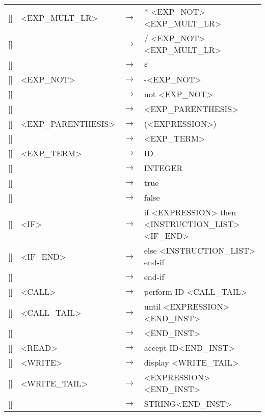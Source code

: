 \documentclass[a4paper,11pt]{article}
\newcounter{rule}
\newcommand{\addRule}[2]{%
	\stepcounter{rule} [\arabic{rule}] & #1 & $\rightarrow$ & #2 \tabularnewline
}
\begin{document}
\begin{longtable}{lll>{\raggedright}p{10cm}}
	\addRule{<EXP\_MULT\_LR>}{* <EXP\_NOT> <EXP\_MULT\_LR>}
	\addRule{}{/ <EXP\_NOT> <EXP\_MULT\_LR>}
	\addRule{}{$\varepsilon$}
	\addRule{<EXP\_NOT>}{-<EXP\_NOT>}
	\addRule{}{not <EXP\_NOT>}
	\addRule{}{<EXP\_PARENTHESIS>}
	\addRule{<EXP\_PARENTHESIS>}{(<EXPRESSION>)}
	\addRule{}{<EXP\_TERM>}
	\addRule{<EXP\_TERM>}{ID}
	\addRule{}{INTEGER}
	\addRule{}{true}
	\addRule{}{false}
	\addRule{<IF>}{if <EXPRESSION> then <INSTRUCTION\_LIST> <IF\_END>}
	\addRule{<IF\_END>}{else <INSTRUCTION\_LIST> end-if}
	\addRule{}{end-if}
	\addRule{<CALL>}{perform ID <CALL\_TAIL>}
	\addRule{<CALL\_TAIL>}{until <EXPRESSION><END\_INST>}
	\addRule{}{<END\_INST>}
	\addRule{<READ>}{accept ID<END\_INST>}
	\addRule{<WRITE>}{display <WRITE\_TAIL>}
	\addRule{<WRITE\_TAIL>}{<EXPRESSION><END\_INST>}
	\addRule{}{STRING<END\_INST>}

\end{longtable}
\end{document}
